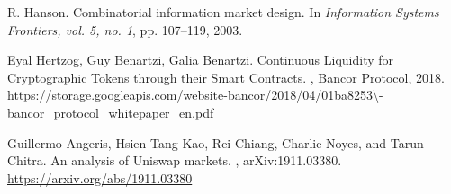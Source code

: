 \documentclass{article}
\begin{document}
\begin{thebibliography}{1}
R. Hanson.
\newblock Combinatorial information market design.
\newblock In {\em Information Systems Frontiers, vol. 5, no. 1}, pp. 107–119, 2003.

Eyal Hertzog, Guy Benartzi, Galia Benartzi.
\newblock Continuous Liquidity for Cryptographic Tokens through their Smart Contracts.
, Bancor Protocol, 2018.
\newblock \url{https://storage.googleapis.com/website-bancor/2018/04/01ba8253\-bancor_protocol_whitepaper_en.pdf}

Guillermo Angeris, Hsien-Tang Kao, Rei Chiang, Charlie Noyes, and Tarun Chitra.
\newblock An analysis of Uniswap markets.
, arXiv:1911.03380.
\newblock \url{https://arxiv.org/abs/1911.03380}

\end{thebibliography}
\end{document}
